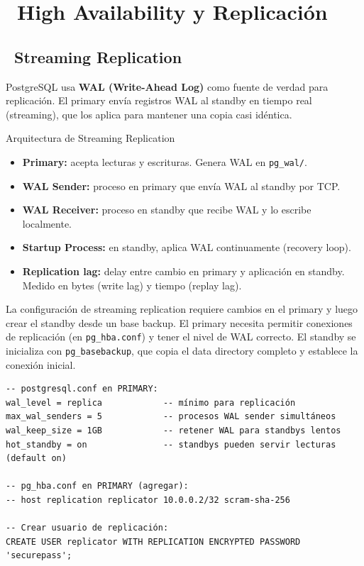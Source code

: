 \chapter[High Availability y Replicación]{~High Availability y Replicación}

\section[Streaming Replication]{~Streaming Replication}

PostgreSQL usa \textbf{WAL (Write-Ahead Log)} como fuente de verdad para replicación.
El primary envía registros WAL al standby en tiempo real (streaming), que los aplica para mantener una copia casi idéntica.

\begin{teoriabox}{Arquitectura de Streaming Replication}
\begin{itemize}
  \item \textbf{Primary:} acepta lecturas y escrituras. Genera WAL en \texttt{pg\_wal/}.
  \item \textbf{WAL Sender:} proceso en primary que envía WAL al standby por TCP.
  \item \textbf{WAL Receiver:} proceso en standby que recibe WAL y lo escribe localmente.
  \item \textbf{Startup Process:} en standby, aplica WAL continuamente (recovery loop).
  \item \textbf{Replication lag:} delay entre cambio en primary y aplicación en standby. Medido en bytes (write lag) y tiempo (replay lag).
\end{itemize}
\end{teoriabox}

La configuración de streaming replication requiere cambios en el primary y luego crear el standby desde un base backup.
El primary necesita permitir conexiones de replicación (en \texttt{pg\_hba.conf}) y tener el nivel de WAL correcto.
El standby se inicializa con \texttt{pg\_basebackup}, que copia el data directory completo y establece la conexión inicial.

\begin{lstlisting}[caption={Configurar streaming replication (Primary)}]
-- postgresql.conf en PRIMARY:
wal_level = replica            -- mínimo para replicación
max_wal_senders = 5            -- procesos WAL sender simultáneos
wal_keep_size = 1GB            -- retener WAL para standbys lentos
hot_standby = on               -- standbys pueden servir lecturas (default on)

-- pg_hba.conf en PRIMARY (agregar):
-- host replication replicator 10.0.0.2/32 scram-sha-256

-- Crear usuario de replicación:
CREATE USER replicator WITH REPLICATION ENCRYPTED PASSWORD 'securepass';
\end{lstlisting}

